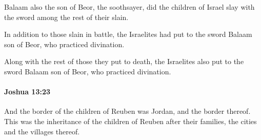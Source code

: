 			\begin{versebox}
					\item[BHS] 
					\item[ASV] Balaam also the son of Beor, the soothsayer, did the children of Israel slay with the sword among the rest of their slain.
					\item[NIV] In addition to those slain in battle, the Israelites had put to the sword Balaam son of Beor, who practiced divination.
					\item[NRSV] Along with the rest of those they put to death, the Israelites also put to the sword Balaam son of Beor, who practiced divination.
			\end{versebox}

		\paragraph{Joshua 13:23} %
			\label{JOSHUA-13-23}

			And the border of the children of Reuben was Jordan, and the border thereof. This was the inheritance of the children of Reuben after their families, the cities and the villages thereof.


